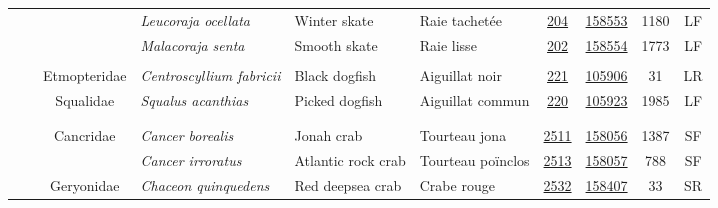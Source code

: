 \documentclass[12pt]{article}\usepackage[]{graphicx}\usepackage[]{color}
\begin{document}
\begin{landscapepage}
\begin{longtable}[t]{ccc>{\centering\arraybackslash}p{3cm}>{\centering\arraybackslash}p{3cm}>{\centering\arraybackslash}p{3cm}>{}c>{}ccc}
\hspace{1em}\hspace{1em} &  &  & \em{Leucoraja ocellata} & Winter skate & Raie tachetée & \href{#sec:204}{204} & \href{http://www.marinespecies.org/aphia.php?p=taxdetails&id=158553}{158553} & 1180 & LF\\
\hspace{1em}\hspace{1em} &  &  & \em{Malacoraja senta} & Smooth skate & Raie lisse & \href{#sec:202}{202} & \href{http://www.marinespecies.org/aphia.php?p=taxdetails&id=158554}{158554} & 1773 & LF\\
\addlinespace[0.3em]
\\
\hspace{1em}\hspace{1em} &  & Etmopteridae & \em{Centroscyllium fabricii} & Black dogfish & Aiguillat noir & \href{#sec:221}{221} & \href{http://www.marinespecies.org/aphia.php?p=taxdetails&id=105906}{105906} & 31 & LR\\
\hspace{1em}\hspace{1em} &  & Squalidae & \em{Squalus acanthias} & Picked dogfish & Aiguillat commun & \href{#sec:220}{220} & \href{http://www.marinespecies.org/aphia.php?p=taxdetails&id=105923}{105923} & 1985 & LF\\
\addlinespace[0.3em]
\\
\addlinespace[0.3em]
\\
\hspace{1em}\hspace{1em} &  & Cancridae & \em{Cancer borealis} & Jonah crab & Tourteau jona & \href{#sec:2511}{2511} & \href{http://www.marinespecies.org/aphia.php?p=taxdetails&id=158056}{158056} & 1387 & SF\\
\hspace{1em}\hspace{1em} &  &  & \em{Cancer irroratus} & Atlantic rock crab & Tourteau poïnclos & \href{#sec:2513}{2513} & \href{http://www.marinespecies.org/aphia.php?p=taxdetails&id=158057}{158057} & 788 & SF\\
\hspace{1em}\hspace{1em} &  & Geryonidae & \em{Chaceon quinquedens} & Red deepsea crab & Crabe rouge & \href{#sec:2532}{2532} & \href{http://www.marinespecies.org/aphia.php?p=taxdetails&id=158407}{158407} & 33 & SR\\

\end{longtable}
\end{landscapepage}
\end{document}
